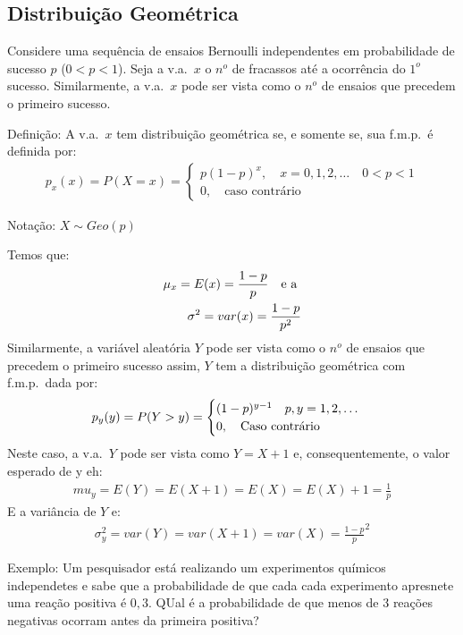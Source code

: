       \subsection{Distribuição Geométrica}
      \begin{description}
        \item  Considere uma sequência de ensaios Bernoulli independentes em probabilidade de 
      sucesso $p$ ($0<p<1$). Seja a v.a.\ $x$ o $n^o$ de fracassos até a ocorrência 
      do $1^o$ sucesso. Similarmente, a v.a.\ $x$ pode ser vista como o $n^o$ de ensaios que precedem 
      o primeiro sucesso.

    \item{Definição}: A v.a.\ $x$ tem distribuição geométrica se, e somente se, sua 
      f.m.p.\ é definida por: 
      \begin{align}
        p_{x}(x)=P(X=x)=\begin{cases}
          p(1-p)^x, \quad x=0,1,2,\dots \quad 0<p<1\\
          0, \quad \text{caso contrário}
        \end{cases}
      \end{align}
      \begin{center}Notação: $X \sim Geo(p)$\end{center}
      Temos que:
      \begin{align}
        \mu_{x}=E(x)=\frac{1-p}{p} \text{\quad e a }\\
        \sigma^2 = var(x)=\frac{1-p}{p^2}
      \end{align}
      Similarmente, a variável aleatória $Y$ pode ser vista como o $n^o$ de ensaios que
      precedem o primeiro sucesso assim, $Y$ tem a distribuição geométrica com f.m.p.\ dada por:
        \begin{align}
        p_y(y)=P(Y>y)=\begin{cases}
          (1-p)^{y-1} \text{\quad }p,y=1,2,\dots \\
          0, \text{\quad Caso contrário}
        \end{cases}
      \end{align}
      Neste caso, a v.a.\ $Y$ pode ser vista como $Y=X+1$ e, consequentemente, o valor esperado de y eh:
      \begin{align} 
      mu_y=E(Y)=E(X+1)=E(X)=E(X)+1= \frac{1}{p}
    \end{align}
    E a variância de $Y$ e:
    \begin{align}
      \sigma_y^2=var(Y)=var(X+1)=var(X)= \frac{1-p}{p}^2
    \end{align}
  \item{Exemplo}: Um pesquisador está realizando um experimentos químicos independetes 
      e sabe que a probabilidade de que cada cada experimento apresnete uma reação 
      positiva é $0,3$. QUal é a probabilidade de que menos de 3 reações negativas 
      ocorram antes da primeira positiva?


\end{description}
